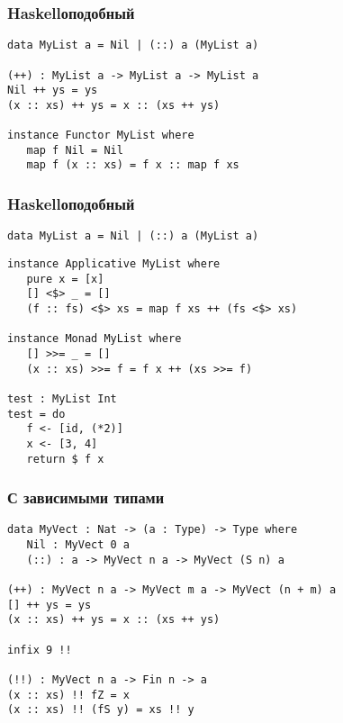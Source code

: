 
\begin{frame}[fragile]
   \frametitle{Haskellоподобный}
   \begin{lstlisting}
data MyList a = Nil | (::) a (MyList a)

(++) : MyList a -> MyList a -> MyList a
Nil ++ ys = ys
(x :: xs) ++ ys = x :: (xs ++ ys)

instance Functor MyList where
   map f Nil = Nil
   map f (x :: xs) = f x :: map f xs
   \end{lstlisting}
\end{frame}

\begin{frame}[fragile]
   \frametitle{Haskellоподобный}
   \begin{lstlisting}[frame=single]
data MyList a = Nil | (::) a (MyList a)
   \end{lstlisting}
   \begin{lstlisting}
instance Applicative MyList where
   pure x = [x]
   [] <$> _ = []
   (f :: fs) <$> xs = map f xs ++ (fs <$> xs)

instance Monad MyList where
   [] >>= _ = []
   (x :: xs) >>= f = f x ++ (xs >>= f)

test : MyList Int
test = do
   f <- [id, (*2)]
   x <- [3, 4]
   return $ f x
   \end{lstlisting}
\end{frame}

\begin{frame}[fragile]
   \frametitle{С зависимыми типами}
   \begin{lstlisting}
data MyVect : Nat -> (a : Type) -> Type where
   Nil : MyVect 0 a
   (::) : a -> MyVect n a -> MyVect (S n) a

(++) : MyVect n a -> MyVect m a -> MyVect (n + m) a
[] ++ ys = ys
(x :: xs) ++ ys = x :: (xs ++ ys)

infix 9 !!

(!!) : MyVect n a -> Fin n -> a
(x :: xs) !! fZ = x
(x :: xs) !! (fS y) = xs !! y
   \end{lstlisting}
\end{frame}

